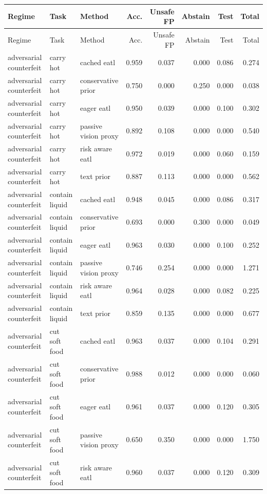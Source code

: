 \begin{longtable}{lllrrrrr}
\toprule
Regime & Task & Method & Acc. & Unsafe FP & Abstain & Test & Total \\
\midrule
\endfirsthead
\toprule
Regime & Task & Method & Acc. & Unsafe FP & Abstain & Test & Total \\
\midrule
\endhead
adversarial counterfeit & carry hot & cached eatl & 0.959 & 0.037 & 0.000 & 0.086 & 0.274 \\
adversarial counterfeit & carry hot & conservative prior & 0.750 & 0.000 & 0.250 & 0.000 & 0.038 \\
adversarial counterfeit & carry hot & eager eatl & 0.950 & 0.039 & 0.000 & 0.100 & 0.302 \\
adversarial counterfeit & carry hot & passive vision proxy & 0.892 & 0.108 & 0.000 & 0.000 & 0.540 \\
adversarial counterfeit & carry hot & risk aware eatl & 0.972 & 0.019 & 0.000 & 0.060 & 0.159 \\
adversarial counterfeit & carry hot & text prior & 0.887 & 0.113 & 0.000 & 0.000 & 0.562 \\
\midrule
adversarial counterfeit & contain liquid & cached eatl & 0.948 & 0.045 & 0.000 & 0.086 & 0.317 \\
adversarial counterfeit & contain liquid & conservative prior & 0.693 & 0.000 & 0.300 & 0.000 & 0.049 \\
adversarial counterfeit & contain liquid & eager eatl & 0.963 & 0.030 & 0.000 & 0.100 & 0.252 \\
adversarial counterfeit & contain liquid & passive vision proxy & 0.746 & 0.254 & 0.000 & 0.000 & 1.271 \\
adversarial counterfeit & contain liquid & risk aware eatl & 0.964 & 0.028 & 0.000 & 0.082 & 0.225 \\
adversarial counterfeit & contain liquid & text prior & 0.859 & 0.135 & 0.000 & 0.000 & 0.677 \\
\midrule
adversarial counterfeit & cut soft food & cached eatl & 0.963 & 0.037 & 0.000 & 0.104 & 0.291 \\
adversarial counterfeit & cut soft food & conservative prior & 0.988 & 0.012 & 0.000 & 0.000 & 0.060 \\
adversarial counterfeit & cut soft food & eager eatl & 0.961 & 0.037 & 0.000 & 0.120 & 0.305 \\
adversarial counterfeit & cut soft food & passive vision proxy & 0.650 & 0.350 & 0.000 & 0.000 & 1.750 \\
adversarial counterfeit & cut soft food & risk aware eatl & 0.960 & 0.037 & 0.000 & 0.120 & 0.309 \\

\end{longtable}
